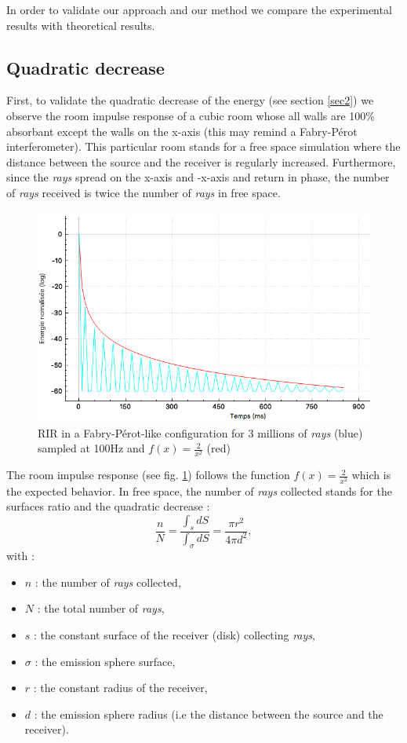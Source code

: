 \documentclass[AMA,STIX1COL]{WileyNJD-v2}
\begin{document}
In order to validate our approach and our method we compare the experimental results with theoretical results. 

\subsection{Quadratic decrease}
First, to validate the quadratic decrease of the energy (see section \ref{sec2}) we observe the room impulse response of a cubic room whose all walls are 100\% absorbant except the walls on the x-axis (this may remind a Fabry-P\'erot interferometer). This particular room stands for a free space simulation where the distance between the source and the receiver is regularly increased. Furthermore, since the \textit{rays} spread on the x-axis and -x-axis and return in phase, the number of \textit{rays} received is twice the number of \textit{rays} in free space.
%
\begin{figure}[h]
\centering
	\includegraphics[width=0.6\linewidth]{test1}
	\caption{RIR in a Fabry-P\'erot-like configuration for 3 millions of \textit{rays} (blue) sampled at 100Hz and $f(x)=\frac{2}{x^2}$ (red)}
	\label{test1}
\end{figure}
%
The room impulse response (see fig. \ref{test1}) follows the function $f(x)=\frac{2}{x^2}$ which is the expected behavior. In free space, the number of \textit{rays} collected stands for the surfaces ratio and the quadratic decrease :
\begin{equation}
\frac{n}{N} = \frac{\int_s dS}{\int_{\sigma} dS} = \frac{\pi r^2}{4\pi d^2},
\end{equation}
with :
\begin{itemize}
\item$n$ : the number of \textit{rays} collected,
\item$N$ : the total number of \textit{rays},
\item$s$ : the constant surface of the receiver (disk) collecting \textit{rays},
\item$\sigma$ : the emission sphere surface,
\item$r$ : the constant radius of the receiver,
\item$d$ : the emission sphere radius (i.e the distance between the source and the receiver).
\end{itemize}
\end{document}

